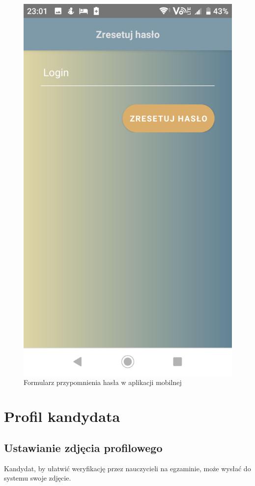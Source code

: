 \documentclass{article}
\begin{document}
\begin{figure}[H]
    \centering
    \includegraphics[width=0.45\linewidth]{images/mobile/reset_password.png}
    \caption{Formularz przypomnienia hasła w aplikacji mobilnej}
    \label{fig:test3_label}
\end{figure}

\section{Profil kandydata}

\subsection{Ustawianie zdjęcia profilowego}
Kandydat, by ułatwić weryfikację przez nauczycieli na egzaminie, może wysłać do systemu swoje zdjęcie. \\
\end{document}
